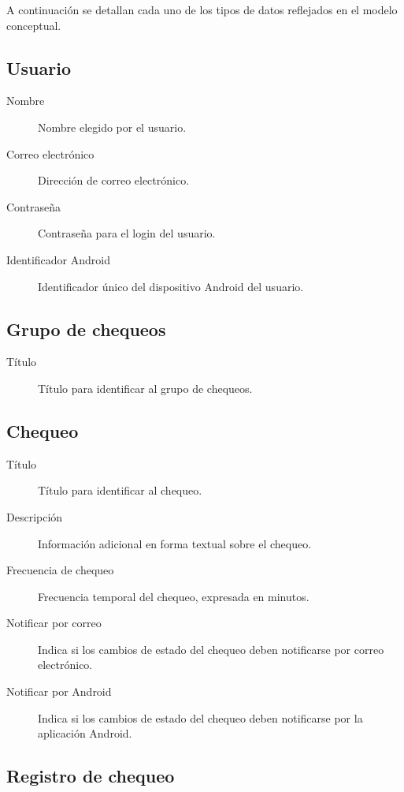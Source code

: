 A continuación se detallan cada uno de los tipos de datos reflejados en el
modelo conceptual.

\subsection{Usuario}

\begin{description}
\item[Nombre] Nombre elegido por el usuario.
\item[Correo electrónico] Dirección de correo electrónico.
\item[Contraseña] Contraseña para el login del usuario.
\item[Identificador Android] Identificador único del dispositivo Android del usuario.
\end{description}

\subsection{Grupo de chequeos}

\begin{description}
\item[Título] Título para identificar al grupo de chequeos.
\end{description}

\subsection{Chequeo}

\begin{description}
\item[Título] Título para identificar al chequeo.
\item[Descripción] Información adicional en forma textual sobre el chequeo.
\item[Frecuencia de chequeo] Frecuencia temporal del chequeo, expresada en minutos.
\item[Notificar por correo] Indica si los cambios de estado del chequeo deben notificarse por correo electrónico.
\item[Notificar por Android] Indica si los cambios de estado del chequeo deben notificarse por la aplicación Android.
\end{description}

\subsection{Registro de chequeo}

